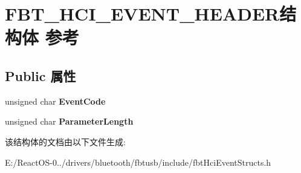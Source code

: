 \hypertarget{struct_f_b_t___h_c_i___e_v_e_n_t___h_e_a_d_e_r}{}\section{F\+B\+T\+\_\+\+H\+C\+I\+\_\+\+E\+V\+E\+N\+T\+\_\+\+H\+E\+A\+D\+E\+R结构体 参考}
\label{struct_f_b_t___h_c_i___e_v_e_n_t___h_e_a_d_e_r}
\subsection*{Public 属性}
\begin{DoxyCompactItemize}
\item 
\mbox{\label{struct_f_b_t___h_c_i___e_v_e_n_t___h_e_a_d_e_r_a6c0e9966b8dc1b9600b8bccdca2e3c2e}} 
unsigned char {\bfseries Event\+Code}
\item 
\mbox{\label{struct_f_b_t___h_c_i___e_v_e_n_t___h_e_a_d_e_r_ae9914230c44cfad118b4bdebd37f37c5}} 
unsigned char {\bfseries Parameter\+Length}
\end{DoxyCompactItemize}


该结构体的文档由以下文件生成\+:\begin{DoxyCompactItemize}
\item 
E\+:/\+React\+O\+S-\/0../drivers/bluetooth/fbtusb/include/fbt\+Hci\+Event\+Structs.\+h\end{DoxyCompactItemize}
